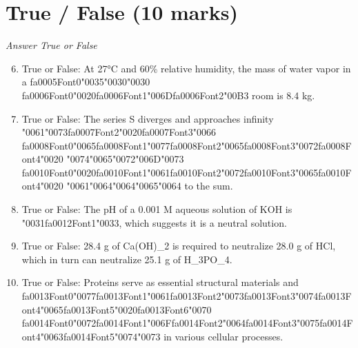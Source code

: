 \documentclass[12pt]{article}
\begin{document}
\section*{True / False (10 marks)}
\textit{Answer True or False}
\begin{enumerate}[label=\arabic*.]
\setcounter{enumi}{5}
\item True or False: At 27°C and 60\% relative humidity, the mass of water vapor in a {\csname fa0005Font0\endcsname\char"0035}{\char"0030}{\char"0030} {\csname fa0006Font0\endcsname\char"0020}{\csname fa0006Font1\endcsname\char"006D}{\csname fa0006Font2\endcsname\char"00B3} room is 8.4 kg.
\item True or False: The series S diverges and approaches infinity {\char"0061}{\char"0073}{\csname fa0007Font2\endcsname\char"0020}{\csname fa0007Font3\endcsname\char"0066} {\csname fa0008Font0\endcsname\char"0065}{\csname fa0008Font1\endcsname\char"0077}{\csname fa0008Font2\endcsname\char"0065}{\csname fa0008Font3\endcsname\char"0072}{\csname fa0008Font4\endcsname\char"0020} {\char"0074}{\char"0065}{\char"0072}{\char"006D}{\char"0073} {\csname fa0010Font0\endcsname\char"0020}{\csname fa0010Font1\endcsname\char"0061}{\csname fa0010Font2\endcsname\char"0072}{\csname fa0010Font3\endcsname\char"0065}{\csname fa0010Font4\endcsname\char"0020} {\char"0061}{\char"0064}{\char"0064}{\char"0065}{\char"0064} to the sum.
\item True or False: The pH of a 0.001 M aqueous solution of KOH is {\char"0031}{\csname fa0012Font1\endcsname\char"0033}, which suggests it is a neutral solution.
\item True or False: 28.4 g of Ca(OH)\_2 is required to neutralize 28.0 g of HCl, which in turn can neutralize 25.1 g of H\_3PO\_4.
\item True or False: Proteins serve as essential structural materials and {\csname fa0013Font0\endcsname\char"0077}{\csname fa0013Font1\endcsname\char"0061}{\csname fa0013Font2\endcsname\char"0073}{\csname fa0013Font3\endcsname\char"0074}{\csname fa0013Font4\endcsname\char"0065}{\csname fa0013Font5\endcsname\char"0020}{\csname fa0013Font6\endcsname\char"0070} {\csname fa0014Font0\endcsname\char"0072}{\csname fa0014Font1\endcsname\char"006F}{\csname fa0014Font2\endcsname\char"0064}{\csname fa0014Font3\endcsname\char"0075}{\csname fa0014Font4\endcsname\char"0063}{\csname fa0014Font5\endcsname\char"0074}{\char"0073} in various cellular processes.
\end{enumerate}
\end{document}
